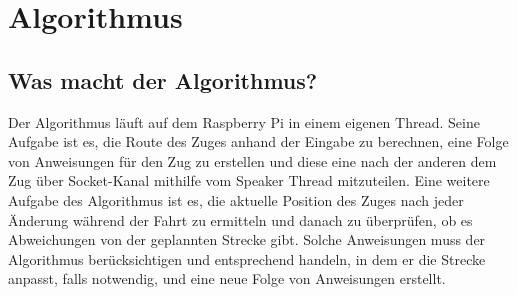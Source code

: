 \renewcommand{\baselinestretch}{1.5} 
%

\chapter{Algorithmus}
\section{Was macht der Algorithmus?}
Der Algorithmus läuft auf dem Raspberry Pi in einem eigenen Thread. Seine Aufgabe ist es, die Route des Zuges anhand der Eingabe zu berechnen, eine Folge von Anweisungen für den Zug zu erstellen und diese eine nach der anderen dem Zug über Socket-Kanal mithilfe vom Speaker Thread mitzuteilen. Eine weitere Aufgabe des Algorithmus ist es, die aktuelle Position des Zuges nach jeder Änderung während der Fahrt zu ermitteln und danach zu überprüfen, ob es Abweichungen von der geplannten Strecke gibt. Solche Anweisungen muss der Algorithmus berücksichtigen und entsprechend handeln, in dem er die Strecke anpasst, falls notwendig, und eine neue Folge von Anweisungen erstellt.\\
